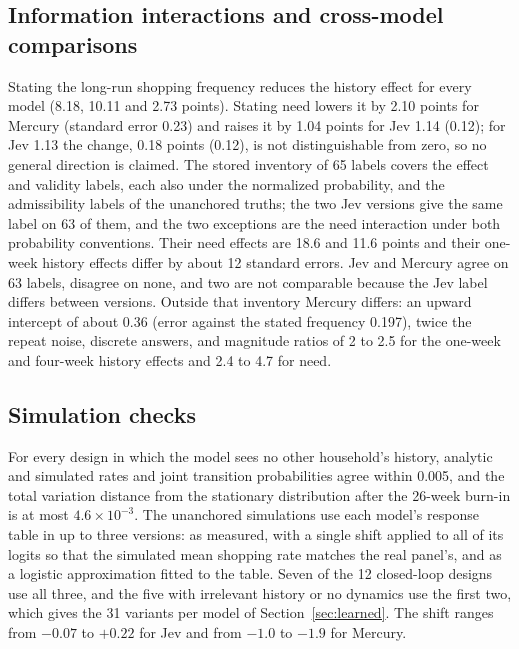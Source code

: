 \documentclass[11pt]{article}
\begin{document}
\subsection{Information interactions and cross-model comparisons}
Stating the long-run shopping frequency reduces the
history effect for every model (8.18, 10.11 and 2.73 points). Stating need lowers it by 2.10
points for Mercury (standard error 0.23) and raises it by 1.04 points for Jev 1.14 (0.12); for
Jev 1.13 the change, 0.18 points (0.12), is not distinguishable from zero, so no general direction
is claimed. The stored inventory of 65 labels covers the effect and validity labels, each also
under the normalized probability, and the admissibility labels of the unanchored truths; the two
Jev versions give the same label on 63 of them, and the two exceptions are the need interaction
under both probability conventions. Their need effects are 18.6 and 11.6 points and their one-week
history effects differ by about 12 standard errors. Jev and Mercury agree on 63 labels, disagree on none,
and two are not comparable because the Jev label differs between versions. Outside that inventory
Mercury differs: an upward intercept of about 0.36 (error against the stated frequency 0.197), twice the
repeat noise, discrete answers, and magnitude ratios of 2 to 2.5 for the one-week and four-week history
effects and 2.4 to 4.7 for need.

\subsection{Simulation checks}
For every design in which the model sees no other household's history, analytic and simulated rates
and joint transition probabilities agree within 0.005, and the total variation distance from the stationary distribution after the 26-week burn-in is
at most $4.6\times10^{-3}$. The unanchored simulations use each model's response table in up to three versions: as
measured, with a single shift applied to all of its logits so that the simulated mean shopping
rate matches the real panel's, and as a logistic approximation fitted to the table. Seven of the
12 closed-loop designs use all three, and the five with irrelevant history or no dynamics use the
first two, which gives the 31 variants per model of Section~\ref{sec:learned}. The shift ranges
from $-0.07$ to $+0.22$ for Jev and from $-1.0$ to $-1.9$ for Mercury.
\end{document}
